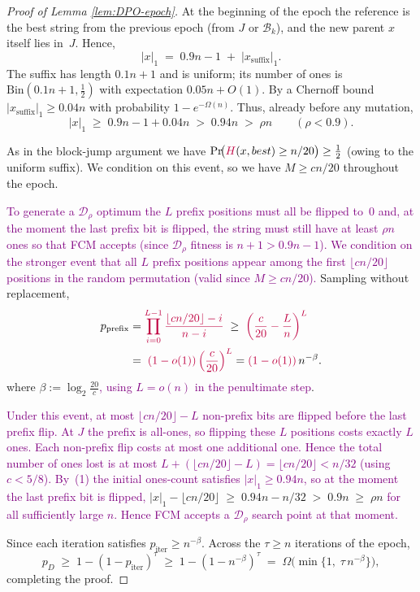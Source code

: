 \documentclass[lettersize,journal]{IEEEtran}
\newcommand{\rerev}[1]{\textcolor{purple}{#1}}
\begin{document}
\begin{proof}[Proof of Lemma \ref{lem:DPO-epoch}]
	At the beginning of the epoch the reference is the best string from the previous
	epoch (from $J$ or $\mathcal{B}_k$), and the new parent $x$ itself lies in~$J$.
	Hence,
	\[
	|x|_1\;=\;0.9n-1 \;+\; |x_{\text{suffix}}|_1.
	\]
	The suffix has length $0.1n+1$ and is uniform; its number of ones is
	$\mathrm{Bin}(0.1n+1,\tfrac12)$ with expectation $0.05n+O(1)$.
	By a Chernoff bound
	\(
	|x_{\text{suffix}}|_1\ge 0.04n
	\)
	with probability $1-e^{-\Omega(n)}$.
	Thus, already before any mutation,
	\[
	|x|_1
	\;\ge\;
	0.9n-1 + 0.04n
	\;>\;
	0.94n
	\;>\;
	\rho n
	\qquad(\rho<0.9).
	\tag{1}
	\]
	
As in the block-jump argument we have
	\(
	\Pr\!\bigl(\rerev{H}(x,best)\ge n/20\bigr)\ge\tfrac12
	\)
	(owing to the uniform suffix). We condition on this event, so we have
	 \(M\ge cn/20\) throughout the epoch.
	
\rerev{To generate a $\mathcal{D}_\rho$ optimum the $L$ prefix positions
	must all be flipped to~$0$ and, at the moment the last prefix bit is flipped,
	the string must still have at least $\rho n$ ones so that FCM accepts
	(since $\mathcal{D}_\rho$ fitness is $n+1>0.9n-1$).
	We condition on the stronger event that all $L$ prefix positions appear
	among the first $\lfloor cn/20\rfloor$ positions in the random permutation
	(valid since $M\ge cn/20$).}
	Sampling without replacement,
	\begin{align*}
		p_{\text{prefix}}
&=\rerev{\prod_{i=0}^{L-1}\frac{\lfloor cn/20\rfloor-i}{n-i}}
		\;\ge\;
		\rerev{\left(\frac{c}{20}-\frac{L}{n}\right)^{L}}
		\\ \;&=\;
		\rerev{(1-o(1))\left(\frac{c}{20}\right)^{L}}
		=\rerev{(1-o(1))\,}n^{-\beta}.
	\end{align*}
	where $\beta:=\log_{2}\frac{20}{c}$\rerev{, using $L=o(n)$ in the penultimate step}.
	
\rerev{Under this event, at most $\lfloor cn/20\rfloor - L$ non-prefix
	bits are flipped before the last prefix flip.
	At $J$ the prefix is all-ones, so flipping these $L$ positions
	costs exactly $L$ ones.  Each non-prefix flip costs at most one
	additional one.  Hence the total number of ones lost is at most
	$L + (\lfloor cn/20\rfloor - L) = \lfloor cn/20\rfloor < n/32$
	(using $c<5/8$).
	By~(1) the initial ones-count satisfies $|x|_1\ge 0.94n$, so at
	the moment the last prefix bit is flipped,}
$|x|_1 - \lfloor cn/20\rfloor\;\ge\;0.94n - n/32
	\;>\; 0.9n
	\;\ge\;\rho n$
\rerev{for all sufficiently large $n$.
Hence FCM accepts a $\mathcal{D}_\rho$ search point at that moment.}
	
Since each iteration satisfies \(p_{\text{iter}}\ge n^{-\beta}\).
	Across the \(\tau\ge n\) iterations of the epoch,
	\[
	p_D
	\;\ge\;
	1-(1-p_{\text{iter}})^{\tau}
	\;\ge\;
1-(1-n^{-\beta})^\tau 
	\;=\;
	\Omega\!\bigl(\min\{1,\;\tau\,n^{-\beta}\}\bigr),
	\]
	completing the proof.
\end{proof}
\end{document}
